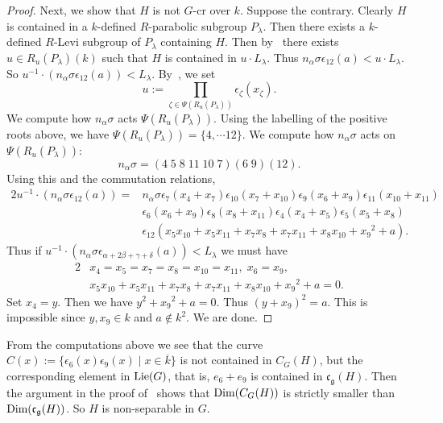 \begin{proof}
Next, we show that $H$ is not $G$-cr over $k$. Suppose the contrary. Clearly $H$ is contained in a $k$-defined $R$-parabolic subgroup $P_\lambda$. Then there exists a $k$-defined $R$-Levi subgroup of $P_\lambda$ containing $H$. Then by~\cite[Lem.~2.5()]{Bate-uniform-TransAMS} there exists $u\in R_u(P_\lambda)(k)$ such that $H$ is contained in $u\cdot L_\lambda$. Thus $n_\alpha\sigma\epsilon_{12}(a) < u\cdot L_\lambda$. So $u^{-1}\cdot (n_\alpha\sigma \epsilon_{12}(a)) < L_{\lambda}$. By~\cite[Prop.~8.2.1]{Springer-book}, we set
\begin{equation*}
u:=\prod_{\zeta\in \Psi(R_u(P_\lambda))}\epsilon_\zeta(x_\zeta).
\end{equation*}
We compute how $n_\alpha \sigma$ acts $\Psi(R_u(P_\lambda))$. Using the labelling of the positive roots above, we have $\Psi(R_u(P_\lambda))=\{4,\cdots 12\}$. We compute how $n_\alpha \sigma$ acts on $\Psi(R_u(P_\lambda))$: 
\begin{equation}\label{perm}
n_\alpha \sigma = (4\;5\;8\;11\;10\;7) (6\;9) (12). 
\end{equation}
Using this and the commutation relations,
\begin{alignat*}{2}
u^{-1}\cdot (n_\alpha\sigma \epsilon_{12}(a))
=&n_\alpha \sigma\epsilon_7(x_4+x_7)\epsilon_{10}(x_7+x_{10})\epsilon_{9}(x_6+x_9)\epsilon_{11}(x_{10}+x_{11})\\
&\epsilon_{6}(x_6+x_9)\epsilon_{8}(x_8+x_{11})\epsilon_{4}(x_4+x_5)\epsilon_{5}(x_5+x_8)\\
&\epsilon_{12}(x_5 x_{10}+x_{5}x_{11}+x_7 x_8 +x_7 x_{11}+x_8 x_{10}+{x_9}^2+a).
\end{alignat*}
Thus if $u^{-1}\cdot (n_\alpha\sigma \epsilon_{\alpha+2\beta+\gamma+\delta}(a)) < L_{\lambda}$ we must have
\begin{alignat*}{2}
&x_4=x_5=x_7=x_{8}=x_{10}=x_{11},\; x_6=x_9,\\
&x_5 x_{10}+x_{5}x_{11}+x_7 x_8 +x_7 x_{11}+x_8 x_{10}+{x_9}^2+a=0.
\end{alignat*}
Set $x_4=y$. Then we have $y^2+{x_9}^2+a=0$. Thus $(y+x_9)^2=a$. This is impossible since $y, x_9\in k$ and $a\notin k^2$. We are done. 
\end{proof}

\begin{rem}\label{D4nonsep}
From the computations above we see that the curve $C(x):=\{\epsilon_{6}(x)\epsilon_{9}(x)\mid x\in \overline k\}$ is not contained in $C_G(H)$, but the corresponding element in $\textup{Lie}(G)$, that is, $e_6+e_9$ is contained in $\mathfrak{c}_{\mathfrak{g}}(H)$. Then the argument in the proof of~\cite[Prop.~3.3]{Uchiyama-Separability-JAlgebra} shows that $\textup{Dim}(C_G(H))$ is strictly smaller than $\textup{Dim}(\mathfrak{c}_{\mathfrak{g}}(H))$. So $H$ is non-separable in $G$. 
\end{rem} 

